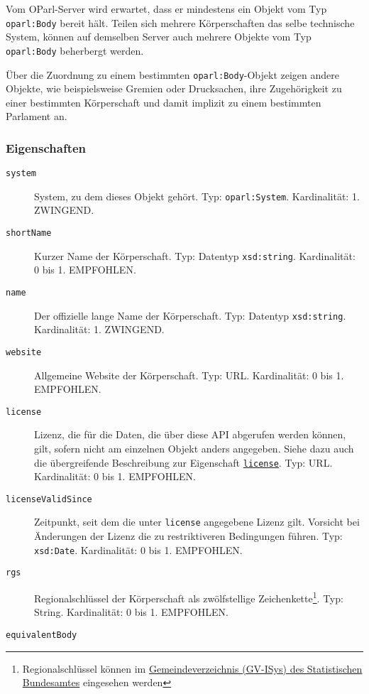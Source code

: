 \documentclass[,a4paper]{article}
\begin{document}
Vom OParl-Server wird erwartet, dass er mindestens ein Objekt vom Typ
\texttt{oparl:Body} bereit hält. Teilen sich mehrere Körperschaften das
selbe technische System, können auf demselben Server auch mehrere
Objekte vom Typ \texttt{oparl:Body} beherbergt werden.

Über die Zuordnung zu einem bestimmten \texttt{oparl:Body}-Objekt zeigen
andere Objekte, wie beispielsweise Gremien oder Drucksachen, ihre
Zugehörigkeit zu einer bestimmten Körperschaft und damit implizit zu
einem bestimmten Parlament an.

\subsubsection{Eigenschaften}\label{eigenschaften-1}

\begin{description}
\item[\texttt{system}]
System, zu dem dieses Objekt gehört. Typ: \texttt{oparl:System}.
Kardinalität: 1. ZWINGEND.
\item[\texttt{shortName}]
Kurzer Name der Körperschaft. Typ: Datentyp \texttt{xsd:string}.
Kardinalität: 0 bis 1. EMPFOHLEN.
\item[\texttt{name}]
Der offizielle lange Name der Körperschaft. Typ: Datentyp
\texttt{xsd:string}. Kardinalität: 1. ZWINGEND.
\item[\texttt{website}]
Allgemeine Website der Körperschaft. Typ: URL. Kardinalität: 0 bis 1.
EMPFOHLEN.
\item[\texttt{license}]
Lizenz, die für die Daten, die über diese API abgerufen werden können,
gilt, sofern nicht am einzelnen Objekt anders angegeben. Siehe dazu auch
die übergreifende Beschreibung zur Eigenschaft
\hyperref[eigenschaftux5flicense]{\texttt{license}}. Typ: URL.
Kardinalität: 0 bis 1. EMPFOHLEN.
\item[\texttt{licenseValidSince}]
Zeitpunkt, seit dem die unter \texttt{license} angegebene Lizenz gilt.
Vorsicht bei Änderungen der Lizenz die zu restriktiveren Bedingungen
führen. Typ: \texttt{xsd:Date}. Kardinalität: 0 bis 1. EMPFOHLEN.
\item[\texttt{rgs}]
Regionalschlüssel der Körperschaft als zwölfstellige
Zeichenkette\footnote{Regionalschlüssel können im
  \href{https://www.destatis.de/DE/ZahlenFakten/LaenderRegionen/Regionales/Gemeindeverzeichnis/Gemeindeverzeichnis.html}{Gemeindeverzeichnis
  (GV-ISys) des Statistischen Bundesamtes} eingesehen werden}. Typ:
String. Kardinalität: 0 bis 1. EMPFOHLEN.
\item[\texttt{equivalentBody}]

\end{description}
\end{document}
